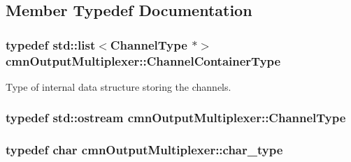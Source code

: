 \subsection{Member Typedef Documentation}
\hypertarget{classcmn_output_multiplexer_aca2d6dc567cf721a0dbb2f887c175b7b}{
\subsubsection[{Channel\-Container\-Type}]{\setlength{\rightskip}{0pt plus 5cm}typedef std\-::list$<${\bf Channel\-Type} $\ast$$>$ {\bf cmn\-Output\-Multiplexer\-::\-Channel\-Container\-Type}}}\label{classcmn_output_multiplexer_aca2d6dc567cf721a0dbb2f887c175b7b}
Type of internal data structure storing the channels. \hypertarget{classcmn_output_multiplexer_abebdbc4cebf9eeb2ce4159f2c649968e}{
\subsubsection[{Channel\-Type}]{\setlength{\rightskip}{0pt plus 5cm}typedef std\-::ostream {\bf cmn\-Output\-Multiplexer\-::\-Channel\-Type}}}\label{classcmn_output_multiplexer_abebdbc4cebf9eeb2ce4159f2c649968e}
\hypertarget{classcmn_output_multiplexer_aa35542dd7f4e6d55780bc7ed741910fe}{
\subsubsection[{char\-\_\-type}]{\setlength{\rightskip}{0pt plus 5cm}typedef char {\bf cmn\-Output\-Multiplexer\-::char\-\_\-type}}}\label{classcmn_output_multiplexer_aa35542dd7f4e6d55780bc7ed741910fe}


